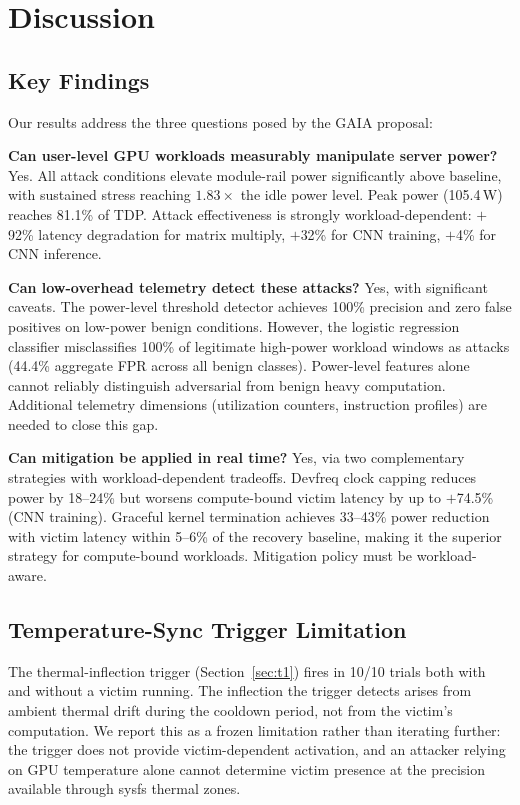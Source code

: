\documentclass[conference]{IEEEtran}
\begin{document}
\section{Discussion}
\label{sec:discussion}

\subsection{Key Findings}

Our results address the three questions posed by the GAIA proposal:

\textbf{Can user-level GPU workloads measurably manipulate server
power?}  Yes.  All attack conditions elevate module-rail power
significantly above baseline, with sustained stress reaching
$1.83\times$ the idle power level.  Peak power (105.4\,W) reaches
81.1\% of TDP.  Attack effectiveness is strongly
workload-dependent: $+$92\% latency degradation for matrix multiply,
$+$32\% for CNN training, $+$4\% for CNN inference.

\textbf{Can low-overhead telemetry detect these attacks?}  Yes, with
significant caveats.  The power-level threshold detector achieves
100\% precision and zero false positives on low-power benign
conditions.  However, the logistic regression classifier misclassifies
100\% of legitimate high-power workload windows as attacks (44.4\%
aggregate FPR across all benign classes).  Power-level features alone
cannot reliably distinguish adversarial from benign heavy computation.
Additional telemetry dimensions (utilization counters, instruction
profiles) are needed to close this gap.

\textbf{Can mitigation be applied in real time?}  Yes, via two
complementary strategies with workload-dependent tradeoffs.  Devfreq
clock capping reduces power by 18--24\% but worsens compute-bound
victim latency by up to $+$74.5\% (CNN training).  Graceful kernel
termination achieves 33--43\% power reduction with victim latency
within 5--6\% of the recovery baseline, making it the superior
strategy for compute-bound workloads.  Mitigation policy must be
workload-aware.

\subsection{Temperature-Sync Trigger Limitation}

The thermal-inflection trigger (Section~\ref{sec:t1}) fires in 10/10
trials both with and without a victim running.  The inflection the
trigger detects arises from ambient thermal drift during the
cooldown period, not from the victim's computation.  We report this as
a frozen limitation rather than iterating further: the trigger does
not provide victim-dependent activation, and an attacker relying on
GPU temperature alone cannot determine victim presence at the
precision available through sysfs thermal zones.
\end{document}
